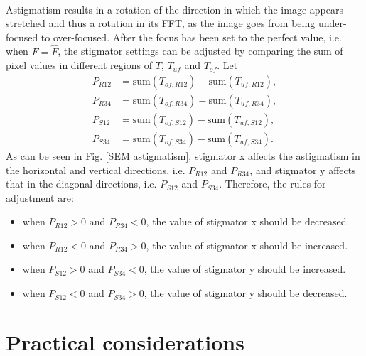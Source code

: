 \documentclass[12pt, twocolumn]{report}
\begin{document}
\paragraph{}
Astigmatism results in a rotation of the direction in which the image appears stretched and thus a rotation in its FFT, as the image goes from being under-focused to over-focused. After the focus has been set to the perfect value, i.e. when $F=\hat{F}$, the stigmator settings can be adjusted by comparing the sum of pixel values in different regions of $T$, $T_{uf}$ and $T_{of}$. Let
\begin{align}
    P_{R12} & = \text{sum}(T_{of,R12}) - \text{sum}(T_{uf,R12}), \\
    P_{R34} & = \text{sum}(T_{of,R34}) - \text{sum}(T_{uf,R34}), \\
    P_{S12} & = \text{sum}(T_{of,S12}) - \text{sum}(T_{uf,S12}), \\
    P_{S34} & = \text{sum}(T_{of,S34}) - \text{sum}(T_{uf,S34}).
\end{align}
As can be seen in Fig. \ref{SEM astigmatism}, stigmator x affects the astigmatism in the horizontal and vertical directions, i.e. $P_{R12}$ and $P_{R34}$, and stigmator y affects that in the diagonal directions, i.e. $P_{S12}$ and ${P_{S34}}$. Therefore, the rules for adjustment are:
\begin{itemize}
    \item when $P_{R12}>0$ and $P_{R34}<0$, the value of stigmator x should be decreased.
    \item when $P_{R12}<0$ and $P_{R34}>0$, the value of stigmator x should be increased.
    \item when $P_{S12}>0$ and $P_{S34}<0$, the value of stigmator y should be increased.
    \item when $P_{S12}<0$ and $P_{S34}>0$, the value of stigmator y should be decreased.
\end{itemize}

\section{Practical considerations}
\end{document}
